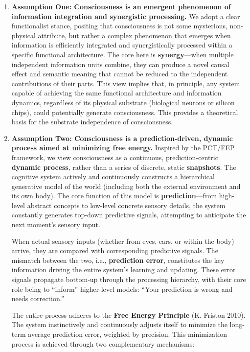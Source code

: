 \documentclass[
  a4paper]{article}
\begin{document}
\begin{enumerate}
\def\labelenumi{\arabic{enumi}.}
\item
  \textbf{Assumption One: Consciousness is an emergent phenomenon of
  information integration and synergistic processing.} We adopt a clear
  functionalist stance, positing that consciousness is not some
  mysterious, non-physical attribute, but rather a complex phenomenon
  that emerges when information is efficiently integrated and
  synergistically processed within a specific functional architecture.
  The core here is \textbf{synergy}---when multiple independent
  information units combine, they can produce a novel causal effect and
  semantic meaning that cannot be reduced to the independent
  contributions of their parts. This view implies that, in principle,
  any system capable of achieving the same functional architecture and
  information dynamics, regardless of its physical substrate (biological
  neurons or silicon chips), could potentially generate consciousness.
  This provides a theoretical basis for the substrate independence of
  consciousness.
\item
  \textbf{Assumption Two: Consciousness is a prediction-driven, dynamic
  process aimed at minimizing free energy.} Inspired by the PCT/FEP
  framework, we view consciousness as a continuous, prediction-centric
  \textbf{dynamic process}, rather than a series of discrete, static
  \textbf{snapshots}. The cognitive system actively and continuously
  constructs a hierarchical generative model of the world (including
  both the external environment and its own body). The core function of
  this model is \textbf{prediction}---from high-level abstract concepts
  to low-level concrete sensory details, the system constantly generates
  top-down predictive signals, attempting to anticipate the next
  moment's sensory input.

  When actual sensory inputs (whether from eyes, ears, or within the
  body) arrive, they are compared with corresponding predictive signals.
  The mismatch between the two, i.e., \textbf{prediction error},
  constitutes the key information driving the entire system's learning
  and updating. These error signals propagate bottom-up through the
  processing hierarchy, with their core role being to ``inform''
  higher-level models: ``Your prediction is wrong and needs
  correction.''

  The entire process adheres to the \textbf{Free Energy Principle} (K.
  Friston 2010). The system instinctively and continuously adjusts
  itself to minimize the long-term average prediction error, weighted by
  precision. This minimization process is achieved through two
  complementary mechanisms:


\end{enumerate}
\end{document}
